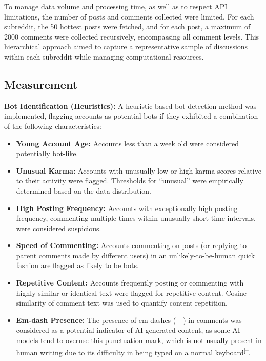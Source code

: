 \documentclass[
  12pt,
  letterpaper,
  DIV=11,
  numbers=noendperiod,
  abstract]{scrartcl}
\providecommand{\tightlist}{%
  \setlength{\itemsep}{0pt}\setlength{\parskip}{0pt}}\usepackage{longtable,booktabs,array}
\begin{document}
To manage data volume and processing time, as well as to respect API
limitations, the number of posts and comments collected were limited.
For each subreddit, the 50 hottest posts were fetched, and for each
post, a maximum of 2000 comments were collected recursively,
encompassing all comment levels. This hierarchical approach aimed to
capture a representative sample of discussions within each subreddit
while managing computational resources.

\subsection{Measurement}\label{measurement}

\textbf{Bot Identification (Heuristics):} A heuristic-based bot
detection method was implemented, flagging accounts as potential bots if
they exhibited a combination of the following characteristics:

\begin{itemize}
\tightlist
\item
  \textbf{Young Account Age:} Accounts less than a week old were
  considered potentially bot-like.
\item
  \textbf{Unusual Karma:} Accounts with unusually low or high karma
  scores relative to their activity were flagged. Thresholds for
  ``unusual'' were empirically determined based on the data
  distribution.
\item
  \textbf{High Posting Frequency:} Accounts with exceptionally high
  posting frequency, commenting multiple times within unusually short
  time intervals, were considered suspicious.
\item
  \textbf{Speed of Commenting:} Accounts commenting on posts (or
  replying to parent comments made by different users) in an
  unlikely-to-be-human quick fashion are flagged as likely to be bots.
\item
  \textbf{Repetitive Content:} Accounts frequently posting or commenting
  with highly similar or identical text were flagged for repetitive
  content. Cosine similarity of comment text was used to quantify
  content repetition.
\item
  \textbf{Em-dash Presence:} The presence of em-dashes (---) in comments
  was considered as a potential indicator of AI-generated content, as
  some AI models tend to overuse this punctuation mark, which is not
  usually present in human writing due to its difficulty in being typed
  on a normal
  keyboard\textsuperscript{{[}--\citeproc{ref-nightwateremdash}{22}{]}}.
\end{itemize}
\end{document}
